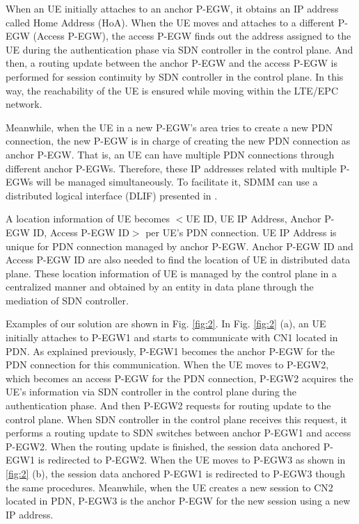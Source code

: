 \documentclass[runningheads,a4paper]{llncs}
\begin{document}
When an UE initially attaches to an anchor P-EGW, it obtains an IP address called Home Address (HoA). When the UE moves and attaches to a different P-EGW (Access P-EGW), the access P-EGW finds out the address assigned to the UE during the authentication phase via SDN controller in the control plane. And then, a routing update between the anchor P-EGW and the access P-EGW is performed for session continuity by SDN controller in the control plane. In this way, the reachability of the UE is ensured while moving within the LTE/EPC network.

Meanwhile, when the UE in a new P-EGW's area tries to create a new PDN connection, the new P-EGW is in charge of creating the new PDN connection as anchor P-EGW. That is, an UE can have multiple PDN connections through different anchor P-EGWs. Therefore, these IP addresses related with multiple P-EGWs will be managed simultaneously. To facilitate it, SDMM can use a distributed logical interface (DLIF) presented in \cite{ref10}.

A location information of UE becomes $<$UE ID, UE IP Address, Anchor P-EGW ID, Access P-EGW ID$>$ per UE's PDN connection. UE IP Address is unique for PDN connection managed by anchor P-EGW. Anchor P-EGW ID and Access P-EGW ID are also needed to find the location of UE in distributed data plane. These location information of UE is managed by the control plane in a centralized manner and obtained by an entity in data plane through the mediation of SDN controller.

Examples of our solution are shown in Fig. \ref{fig:2}. In Fig. \ref{fig:2} (a), an UE initially attaches to P-EGW1 and starts to communicate with CN1 located in PDN. As explained previously, P-EGW1 becomes the anchor P-EGW for the PDN connection for this communication. When the UE moves to P-EGW2, which becomes an access P-EGW for the PDN connection, P-EGW2 acquires the UE's information via SDN controller in the control plane during the authentication phase. And then P-EGW2 requests for routing update to the control plane. When SDN controller in the control plane receives this request, it performs a routing update to SDN switches between anchor P-EGW1 and access P-EGW2. When the routing update is finished, the session data anchored P-EGW1 is redirected to P-EGW2. When the UE moves to P-EGW3 as shown in \ref{fig:2} (b), the session data anchored P-EGW1 is redirected to P-EGW3 though the same procedures. Meanwhile, when the UE creates a new session to CN2 located in PDN, P-EGW3 is the anchor P-EGW for the new session using a new IP address.
\end{document}
